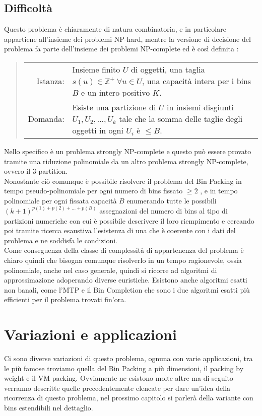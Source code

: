 \subsection{Difficoltà}
Questo problema è chiaramente di natura combinatoria, e in particolare appartiene all'insieme dei problemi NP-hard, mentre
la versione di decisione del problema fa parte dell'insieme dei problemi NP-complete ed è così definita \cite{CaI_NP}:
\begin{quote}\def\arraystretch{1.2}
    \begin{tabularx}{\linewidth}{@{} rX @{}}
        Istanza: & Insieme finito $ U $ di oggetti, una taglia $ s(u) \in \mathbb{Z}^+ \: \forall u \in U $, una capacità intera
                   per i bins $ B $ e un intero positivo $ K $. \\
        Domanda: & Esiste una partizione di $ U $ in insiemi disgiunti $ U_1, U_2, ..., U_k $ tale che la somma delle taglie degli
                   oggetti in ogni $ U_i $ è $ \leq B $.
    \end{tabularx}
\end{quote}
Nello specifico è un problema strongly NP-complete e questo può essere provato tramite una riduzione polinomiale da un altro
problema strongly NP-complete, ovvero il 3-partition. \\
Nonostante ciò comunque è possibile risolvere il problema del Bin Packing in tempo pseudo-polinomiale per ogni numero di
bins fissato $ \geq 2 $ \cite{BinPackingFixedSize}, e in tempo polinomiale per
ogni fissata capacità $ B $ enumerando tutte le possibili $ (k+1)^{p(1) + p(2) + ... + p(B)} $ assegnazioni del numero di bins al
tipo di partizioni numeriche con cui è possibile descrivere il loro riempimento e cercando poi tramite ricerca esaustiva l'esistenza di una
che è coerente con i dati del problema e ne soddisfa le condizioni. \\
Come conseguenza della classe di complessità di appartenenza del problema è chiaro quindi che bisogna comunque risolverlo
in un tempo ragionevole, ossia polinomiale, anche nel caso generale, quindi si ricorre ad algoritmi
di approssimazione adoperando diverse euristiche.
Esistono anche algoritmi esatti non banali, come l'MTP \cite{MTP} e il Bin Completion \cite{BinCompletion} che sono i due
algoritmi esatti più efficienti per il problema trovati fin'ora.


\section{Variazioni e applicazioni}
Ci sono diverse variazioni di questo problema, ognuna con varie applicazioni, tra le più famose troviamo quella
del Bin Packing a più dimensioni, il packing by weight e il VM packing. Ovviamente ne esistono molte altre ma di seguito 
verranno descritte quelle precedentemente elencate per dare un'idea della ricorrenza di questo problema, nel prossimo 
capitolo si parlerà della variante con bins estendibili nel dettaglio.

